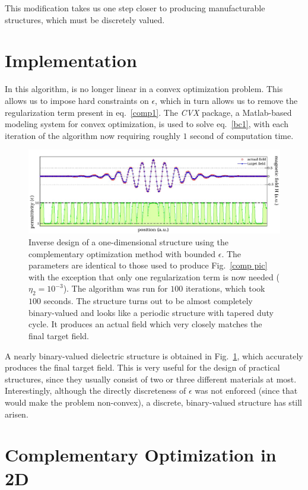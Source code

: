 This modification takes us one step closer to producing manufacturable structures,
    which must be discretely valued.

\section{Implementation} 
In this algorithm,  is no longer linear in a convex optimization problem\cite{BV04}. This allows us to impose hard constraints on $\epsilon$, which in turn allows us to remove the regularization term present in eq.~\eqref{comp1}. The \emph{CVX} package\cite{CVX}, a Matlab-based modeling system for convex optimization, is used to solve eq.~\eqref{bc1}, with each iteration of the algorithm now requiring roughly $1$ second of computation time.
\begin{figure}[htbp]\centering
\includegraphics[width=\textwidth]{p1/bounded}
\caption{Inverse design of a one-dimensional structure using the complementary optimization method with bounded $\epsilon$. The parameters are identical to those used to produce Fig.~\ref{comp pic} with the exception that only one regularization term is now needed ($\eta_2=10^{-3}$). The algorithm was run for $100$ iterations, which took $100$ seconds. The structure turns out to be almost completely binary-valued and looks like a periodic structure with tapered duty cycle. It produces an actual field which very closely matches the final target field.}
\label{bounded comp pic}
\end{figure}

A nearly binary-valued dielectric structure is obtained in Fig.~\ref{bounded comp pic}, which accurately produces the final target field. This is very useful for the design of practical structures, since they usually consist of two or three different materials at most. Interestingly, although the directly discreteness of $\epsilon$ was not enforced (since that would make the problem non-convex), a discrete, binary-valued structure has still arisen. 

\section{Complementary Optimization in 2D}
